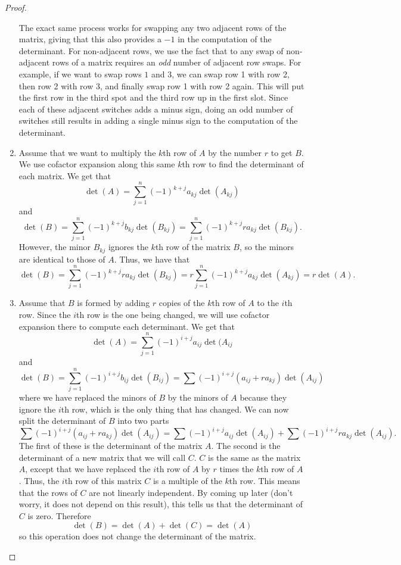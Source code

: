 \begin{proof}
\begin{enumerate}
The exact same process works for swapping any two adjacent rows of the matrix, giving that this also provides a $-1$ in the computation of the determinant. For non-adjacent rows, we use the fact that to any swap of non-adjacent rows of a matrix requires an \emph{odd} number of adjacent row swaps. For example, if we want to swap rows $1$ and $3$, we can swap row 1 with row 2, then row 2 with row 3, and finally swap row 1 with row 2 again. This will put the first row in the third spot and the third row up in the first slot. Since each of these adjacent switches adds a minus sign, doing an odd number of switches still results in adding a single minus sign to the computation of the determinant.
\item Assume that we want to multiply the $k$th row of $A$ by the number $r$ to get $B$. We use cofactor expansion along this same $k$th row to find the determinant of each matrix. We get that
\[ \det(A) = \sum_{j=1}^n (-1)^{k+j}a_{kj}\det(A_{kj}) \] and
\[ \det(B) = \sum_{j=1}^n (-1)^{k+j}b_{kj}\det(B_{kj}) = \sum_{j=1}^n (-1)^{k+j}ra_{kj} \det(B_{kj}). \] However, the minor $B_{kj}$ ignores the $k$th row of the matrix $B$, so the minors are identical to those of $A$. Thus, we have that
\[ \det(B) = \sum_{j=1}^n (-1)^{k+j}ra_{kj} \det(B_{kj}) = r\sum_{j=1}^n (-1)^{k+j}a_{kj} \det(A_{kj}) = r\det(A) .\]
\item Assume that $B$ is formed by adding $r$ copies of the $k$th row of $A$ to the $i$th row. Since the $i$th row is the one being changed, we will use cofactor expansion there to compute each determinant. We get that
\[ \det(A) = \sum_{j=1}^n (-1)^{i+j}a_{ij}\det(A_{ij} \] and 
\[ \det(B) = \sum_{j=1}^n (-1)^{i+j} b_{ij}\det(B_{ij}) = \sum (-1)^{i+j} (a_{ij} + ra_{kj})\det(A_{ij}) \] where we have replaced the minors of $B$ by the minors of $A$ because they ignore the $i$th row, which is the only thing that has changed. We can now split the determinant of $B$ into two parts
\[ \sum (-1)^{i+j} (a_{ij} + ra_{kj})\det(A_{ij}) = \sum (-1)^{i+j} a_{ij}\det(A_{ij}) + \sum (-1)^{i+j} ra_{kj}\det(A_{ij}). \] The first of these is the determinant of the matrix $A$. The second is the determinant of a new matrix that we will call $C$. $C$ is the same as the matrix $A$, except that we have replaced the $i$th row of $A$ by $r$ times the $k$th row of $A$. Thus, the $i$th row of this matrix $C$ is a multiple of the $k$th row. This means that the rows of $C$ are not linearly independent. By  coming up later (don't worry, it does not depend on this result), this tells us that the determinant of $C$ is zero. Therefore
\[ \det(B) = \det(A) + \det(C) = \det(A) \] so this operation does not change the determinant of the matrix.
\end{enumerate}
\end{proof}


